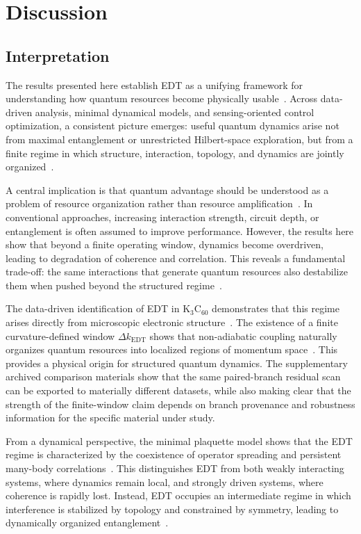 \section{Discussion}

\subsection{Interpretation}

The results presented here establish EDT as a unifying framework for understanding how quantum resources become physically usable~\cite{Horodecki2009,Streltsov2017}. Across data-driven analysis, minimal dynamical models, and sensing-oriented control optimization, a consistent picture emerges: useful quantum dynamics arise not from maximal entanglement or unrestricted Hilbert-space exploration, but from a finite regime in which structure, interaction, topology, and dynamics are jointly organized~\cite{Amico2008,Eisert2010}.

A central implication is that quantum advantage should be understood as a problem of resource organization rather than resource amplification~\cite{Preskill2018}. In conventional approaches, increasing interaction strength, circuit depth, or entanglement is often assumed to improve performance. However, the results here show that beyond a finite operating window, dynamics become overdriven, leading to degradation of coherence and correlation. This reveals a fundamental trade-off: the same interactions that generate quantum resources also destabilize them when pushed beyond the structured regime~\cite{Altman2015,Swingle2018}.

The data-driven identification of EDT in K$_3$C$_{60}$ demonstrates that this regime arises directly from microscopic electronic structure~\cite{Gunnarsson1997,Capone2009}. The existence of a finite curvature-defined window $\Delta k_{\mathrm{EDT}}$ shows that non-adiabatic coupling naturally organizes quantum resources into localized regions of momentum space~\cite{Mead1979,Yarkony1996}. This provides a physical origin for structured quantum dynamics. The supplementary archived comparison materials show that the same paired-branch residual scan can be exported to materially different datasets, while also making clear that the strength of the finite-window claim depends on branch provenance and robustness information for the specific material under study.

From a dynamical perspective, the minimal plaquette model shows that the EDT regime is characterized by the coexistence of operator spreading and persistent many-body correlations~\cite{Choi2016,KimHuse2013}. This distinguishes EDT from both weakly interacting systems, where dynamics remain local, and strongly driven systems, where coherence is rapidly lost. Instead, EDT occupies an intermediate regime in which interference is stabilized by topology and constrained by symmetry, leading to dynamically organized entanglement~\cite{Swingle2018}.

